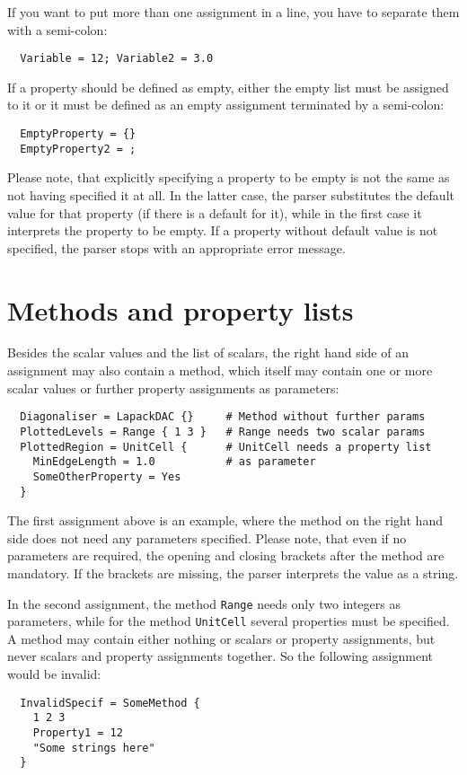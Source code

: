 If you want to put more than one assignment in a line, you have to
separate them with a semi-colon:
\begin{verbatim}
  Variable = 12; Variable2 = 3.0
\end{verbatim}

If a property should be defined as empty, either the empty list must be
assigned to it or it must be defined as an empty assignment
terminated by a semi-colon:
\begin{verbatim}
  EmptyProperty = {}
  EmptyProperty2 = ;
\end{verbatim}

Please note, that explicitly specifying a property to be empty is not
the same as not having specified it at all. In the latter case, the
parser substitutes the default value for that property (if there is a
default for it), while in the first case it interprets the property to
be empty. If a property without default value is not specified, the
parser stops with an appropriate error message.


\section{Methods and property lists}

Besides the scalar values and the list of scalars, the right hand side
of an assignment may also contain a method, which itself may contain
one or more scalar values or further property assignments as
parameters:
\begin{verbatim}
  Diagonaliser = LapackDAC {}     # Method without further params
  PlottedLevels = Range { 1 3 }   # Range needs two scalar params
  PlottedRegion = UnitCell {      # UnitCell needs a property list
    MinEdgeLength = 1.0           # as parameter
    SomeOtherProperty = Yes
  }
\end{verbatim}
The first assignment above is an example, where the method on the
right hand side does not need any parameters specified. Please note,
that even if no parameters are required, the opening and closing
brackets after the method are mandatory. If the brackets are missing,
the parser interprets the value as a string.

In the second assignment, the method \verb|Range| needs only two
integers as parameters, while for the method \verb|UnitCell| several
properties must be specified. A method may contain either nothing or
scalars or property assignments, but never scalars and property
assignments together. So the following assignment would be invalid:
\begin{verbatim}
  InvalidSpecif = SomeMethod {
    1 2 3
    Property1 = 12
    "Some strings here"
  }
\end{verbatim}

